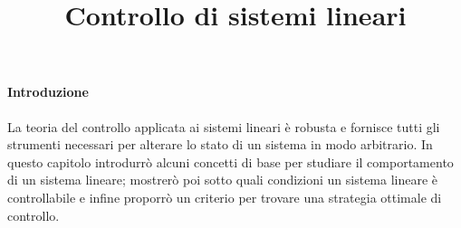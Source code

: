 \title{Controllo di sistemi lineari}
\maketitle
\label{sec:linear-control}

\paragraph{Introduzione}
La teoria del controllo applicata ai sistemi lineari è robusta e fornisce tutti gli strumenti necessari
per alterare lo stato di un sistema in modo arbitrario. In questo capitolo introdurrò alcuni
concetti di base per studiare il comportamento di un sistema lineare; mostrerò poi sotto quali
condizioni un sistema lineare è controllabile e infine proporrò un criterio per trovare una strategia
ottimale di controllo.



